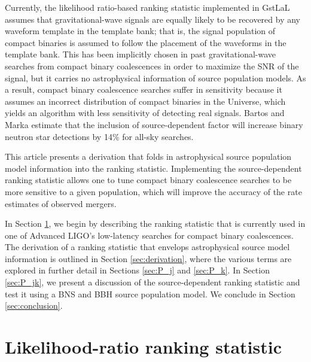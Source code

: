\documentclass[twocolumn,showpacs,unsortedaddress,superscriptaddress,showkeys,nofootinbib,preprintnumbers,letterpaper]{revtex4-1}
\begin{document}
Currently, the likelihood ratio-based ranking statistic implemented in GstLaL assumes that gravitational-wave signals are equally likely to be recovered by any waveform template in the template bank; that is, the signal population of compact binaries is assumed to follow the placement of the waveforms in the template bank. This has been implicitly chosen in past gravitational-wave searches from compact binary coalescences in order to maximize the SNR of the signal, but it carries no astrophysical information of source population models. As a result, compact binary coalescence searches suffer in sensitivity because it assumes an incorrect distribution of compact binaries in the Universe, which yields an algorithm with less sensitivity of detecting real signals. Bartos and Marka \cite{2015PhRvL.115w1101B} estimate that the inclusion of source-dependent factor will increase binary neutron star detections by 14\% for all-sky searches.

This article presents a derivation that folds in astrophysical source population model information into the ranking statistic. Implementing the source-dependent ranking statistic allows one to tune compact binary coalescence searches to be more sensitive to a given population, which will improve the accuracy of the rate estimates of observed mergers. 

In Section \ref{sec:rankingstat}, we begin by describing the ranking statistic that is currently used in one of Advanced LIGO's low-latency searches for compact binary coalescences. The derivation of a ranking statistic that envelops astrophysical source model information is outlined in Section \ref{sec:derivation}, where the various terms are explored in further detail in Sections \ref{sec:P_j} and \ref{sec:P_k}. In Section \ref{sec:P_jk}, we present a discussion of the source-dependent ranking statistic and test it using a BNS and BBH source population model. We conclude in Section \ref{sec:conclusion}.


\section{Likelihood-ratio ranking statistic} \label{sec:rankingstat}
\end{document}
